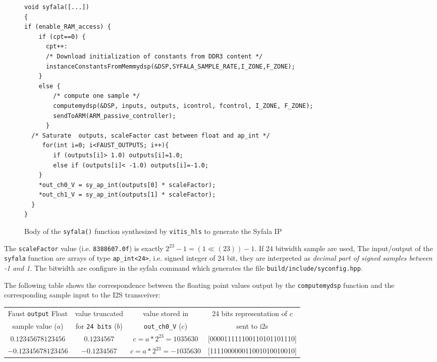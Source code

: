 \documentclass[11pt]{article}
\numberwithin{equation}{section}
\numberwithin{figure}{section}
\begin{document}
\begin{figure}

\begin{boxedminipage}{\textwidth}
    \small
\begin{verbatim}
void syfala([...])
{
if (enable_RAM_access) {
    if (cpt==0) {
      cpt++:
      /* Download initialization of constants from DDR3 content */
      instanceConstantsFromMemmydsp(&DSP,SYFALA_SAMPLE_RATE,I_ZONE,F_ZONE);
    }
    else {
        /* compute one sample */
        computemydsp(&DSP, inputs, outputs, icontrol, fcontrol, I_ZONE, F_ZONE);
        sendToARM(ARM_passive_controller);
      } 
  /* Saturate  outputs, scaleFactor cast between float and ap_int */
     for(int i=0; i<FAUST_OUTPUTS; i++){
    	if (outputs[i]> 1.0) outputs[i]=1.0;
    	else if (outputs[i]< -1.0) outputs[i]=-1.0;
    }
    *out_ch0_V = sy_ap_int(outputs[0] * scaleFactor);
    *out_ch1_V = sy_ap_int(outputs[1] * scaleFactor);
  }
}
\end{verbatim}
\end{boxedminipage}
\caption{Body of the {\tt syfala()} function synthesized by {\tt vitis\_hls} to generate the Syfala IP}
\label{fig:body}
\end{figure}


The {\tt scaleFactor} value (i.e. {\tt 8388607.0f}) is exactly $2^{23}-1 =  (1 \ll (23)) -1$. If 24 bitwidth sample are used, The input/output of the {\tt syfala} function are arrays of type {\tt ap\_int<24>}, i.e. signed integer of 24 bit, they are interpreted as {\em decimal part of signed samples between -1 and 1}. The bitwidth are configure in the syfala command which generates the file {\tt build/include/syconfig.hpp}. 

The following table shows the correspondence between the floating point values output by the {\tt computemydsp} function and the corresponding sample input to the I2S transceiver:
{\small
  \begin{tabular}{|c|c|c|c|}
  \hline
  Faust {\tt output} Float  & value truncated  & value stored in  & 24 bits representation of $c$\\
  sample value ($a$) & for {\tt 24 bits} ($b$) &   {\tt out\_ch0\_V} ($c$)  & sent to i2s  \\
  \hline 
  $0.12345678123456$ & $0.1234567$ & $c=a*2^{23}=1035630$ & [000011111100110101101110] \\
  \hline
$-0.12345678123456$ & $-0.1234567$ & $c=a*2^{23}=-1035630$ & [111100000011001010010010]\\
\hline
\end{tabular}
}
\end{document}
